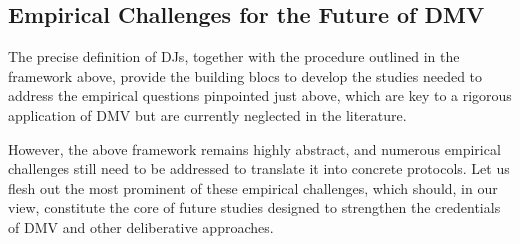 \documentclass[version=3.21, pagesize, twoside=off, bibliography=totoc, DIV=calc, fontsize=12pt, a4paper, french, english]{scrartcl}
\begin{document}


\subsection{Empirical Challenges for the Future of \ac{DMV}}

The precise definition of \acp{DJ}, together with the procedure outlined in the framework above, provide the building blocs to develop the studies needed to address the empirical questions pinpointed just above, which are key to a rigorous application of \ac{DMV} but are currently neglected in the literature.


However, the above framework remains highly abstract, and numerous empirical challenges still need to be addressed to translate it into concrete protocols. Let us flesh out the most prominent of these empirical challenges, which should, in our view, constitute the core of future studies designed to strengthen the credentials of \ac{DMV} and other deliberative approaches. 
\end{document}
